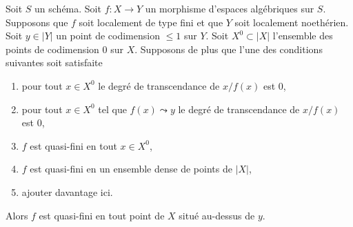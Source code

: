 \begin{lemma}
\label{lemma-quasi-finite-in-codim-1}
Soit $S$ un schéma. Soit $f : X \to Y$ un morphisme d'espaces algébriques
sur $S$. Supposons que $f$ soit localement de type fini et que $Y$ soit
localement noethérien. Soit $y \in |Y|$ un point de codimension $\leq 1$
sur $Y$. Soit $X^0 \subset |X|$ l'ensemble des points de codimension $0$
sur $X$. Supposons de plus que l'une des conditions suivantes soit satisfaite
\begin{enumerate}
\item pour tout $x \in X^0$ le degré de transcendance de $x/f(x)$ est $0$,
\item pour tout $x \in X^0$ tel que $f(x) \leadsto y$
le degré de transcendance de $x/f(x)$ est $0$,
\item $f$ est quasi-fini en tout $x \in X^0$,
\item $f$ est quasi-fini en un ensemble dense de points de $|X|$,
\item ajouter davantage ici.
\end{enumerate}
Alors $f$ est quasi-fini en tout point de $X$ situé au-dessus de $y$.
\end{lemma}

